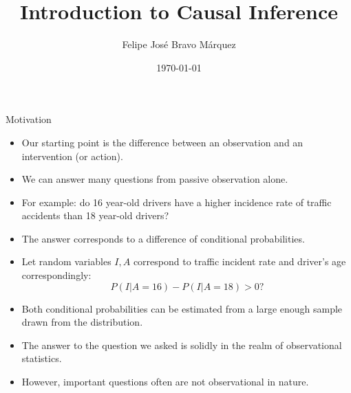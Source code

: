 \documentclass[handout]{beamer}
\title{Introduction to Causal Inference}
\author[Felipe Bravo Márquez]{\footnotesize
 \textcolor[rgb]{0.00,0.00,1.00}{Felipe José Bravo Márquez}}
\date{ \today }
\begin{document}
\begin{frame}
\titlepage


\end{frame}




\begin{frame}{Motivation}
\scriptsize{
\begin{itemize}
\item Our starting point is the difference between an observation and an intervention (or action). 
\item We can answer many questions from passive observation alone.
\item For example: do 16 year-old drivers have a higher incidence rate of traffic accidents than 18 year-old drivers? 
\item The answer corresponds to a difference of conditional probabilities.

\item Let random variables $I,A$ correspond to traffic incident rate and driver's age correspondingly:
\begin{displaymath}
 P(I|A=16)-P(I|A=18)>0?
\end{displaymath}


\item Both conditional probabilities can be estimated from a large enough sample drawn from the distribution.

\item The answer to the question we asked is solidly in the realm of observational statistics.

\item However, important questions often are not observational in nature.

\end{itemize}


} 

\end{frame}
\end{document}
